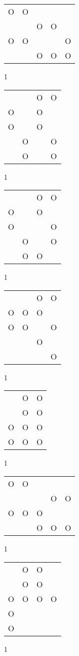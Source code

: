 \begin{tabular}{|m{0.2cm}m{0.2cm}m{0.2cm}m{0.2cm}m{0.2cm}|}\hline
O&O& & & \\
 & &O&O& \\
O&O& & &O\\
 & &O&O&O\\
\hline\end{tabular}1
\begin{tabular}{|m{0.2cm}m{0.2cm}m{0.2cm}m{0.2cm}|}\hline
 & &O&O\\
O& &O& \\
O& &O& \\
 &O& &O\\
 &O& &O\\
\hline\end{tabular}1
\begin{tabular}{|m{0.2cm}m{0.2cm}m{0.2cm}m{0.2cm}|}\hline
 & &O&O\\
O& &O& \\
O& & &O\\
 &O& &O\\
 &O&O& \\
\hline\end{tabular}1
\begin{tabular}{|m{0.2cm}m{0.2cm}m{0.2cm}m{0.2cm}|}\hline
 & &O&O\\
O&O&O& \\
O&O& &O\\
 & &O& \\
 & & &O\\
\hline\end{tabular}1
\begin{tabular}{|m{0.2cm}m{0.2cm}m{0.2cm}|}\hline
 &O&O\\
 &O&O\\
O&O&O\\
O&O&O\\
\hline\end{tabular}1
\begin{tabular}{|m{0.2cm}m{0.2cm}m{0.2cm}m{0.2cm}m{0.2cm}|}\hline
O&O& & & \\
 & & &O&O\\
O&O&O& & \\
 & &O&O&O\\
\hline\end{tabular}1
\begin{tabular}{|m{0.2cm}m{0.2cm}m{0.2cm}m{0.2cm}|}\hline
 &O&O& \\
 &O&O& \\
O&O&O&O\\
O& & & \\
O& & & \\
\hline\end{tabular}1
